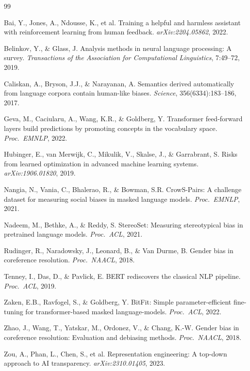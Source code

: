 \documentclass[11pt,a4paper]{article}
\begin{document}
\begin{thebibliography}{99}

Bai, Y., Jones, A., Ndousse, K., et al.
Training a helpful and harmless assistant with reinforcement learning from human feedback.
\textit{arXiv:2204.05862}, 2022.

Belinkov, Y., \& Glass, J.
Analysis methods in neural language processing: A survey.
\textit{Transactions of the Association for Computational Linguistics}, 7:49--72, 2019.

Caliskan, A., Bryson, J.J., \& Narayanan, A.
Semantics derived automatically from language corpora contain human-like biases.
\textit{Science}, 356(6334):183--186, 2017.

Geva, M., Caciularu, A., Wang, K.R., \& Goldberg, Y.
Transformer feed-forward layers build predictions by promoting concepts in the vocabulary space.
\textit{Proc.\ EMNLP}, 2022.

Hubinger, E., van Merwijk, C., Mikulik, V., Skalse, J., \& Garrabrant, S.
Risks from learned optimization in advanced machine learning systems.
\textit{arXiv:1906.01820}, 2019.

Nangia, N., Vania, C., Bhalerao, R., \& Bowman, S.R.
CrowS-Pairs: A challenge dataset for measuring social biases in masked language models.
\textit{Proc.\ EMNLP}, 2021.

Nadeem, M., Bethke, A., \& Reddy, S.
StereoSet: Measuring stereotypical bias in pretrained language models.
\textit{Proc.\ ACL}, 2021.

Rudinger, R., Naradowsky, J., Leonard, B., \& Van Durme, B.
Gender bias in coreference resolution.
\textit{Proc.\ NAACL}, 2018.

Tenney, I., Das, D., \& Pavlick, E.
BERT rediscovers the classical NLP pipeline.
\textit{Proc.\ ACL}, 2019.

Zaken, E.B., Ravfogel, S., \& Goldberg, Y.
BitFit: Simple parameter-efficient fine-tuning for transformer-based masked language-models.
\textit{Proc.\ ACL}, 2022.

Zhao, J., Wang, T., Yatskar, M., Ordonez, V., \& Chang, K.-W.
Gender bias in coreference resolution: Evaluation and debiasing methods.
\textit{Proc.\ NAACL}, 2018.

Zou, A., Phan, L., Chen, S., et al.
Representation engineering: A top-down approach to AI transparency.
\textit{arXiv:2310.01405}, 2023.

\end{thebibliography}
\end{document}
